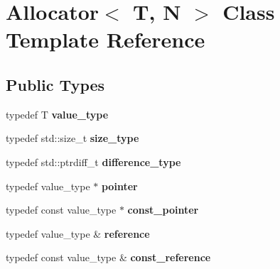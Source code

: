 \hypertarget{classAllocator}{\section{\-Allocator$<$ \-T, \-N $>$ \-Class \-Template \-Reference}
\label{classAllocator}
}
\subsection*{\-Public \-Types}
\begin{DoxyCompactItemize}
\item 
\hypertarget{classAllocator_ad5c51a128db2150e67259f697ef457b9}{typedef \-T {\bfseries value\-\_\-type}}\label{classAllocator_ad5c51a128db2150e67259f697ef457b9}

\item 
\hypertarget{classAllocator_aec4c70d3e80d2b7d11bbb8bd8a62f016}{typedef std\-::size\-\_\-t {\bfseries size\-\_\-type}}\label{classAllocator_aec4c70d3e80d2b7d11bbb8bd8a62f016}

\item 
\hypertarget{classAllocator_a6b650764260187e63d5098f5f38046c2}{typedef std\-::ptrdiff\-\_\-t {\bfseries difference\-\_\-type}}\label{classAllocator_a6b650764260187e63d5098f5f38046c2}

\item 
\hypertarget{classAllocator_a7df4693123ad6d168217e3853cd15495}{typedef value\-\_\-type $\ast$ {\bfseries pointer}}\label{classAllocator_a7df4693123ad6d168217e3853cd15495}

\item 
\hypertarget{classAllocator_a5815a9c01f756005eb19d0ae5aded3be}{typedef const value\-\_\-type $\ast$ {\bfseries const\-\_\-pointer}}\label{classAllocator_a5815a9c01f756005eb19d0ae5aded3be}

\item 
\hypertarget{classAllocator_adf0658602f352de03fa2d2c4f23903e9}{typedef value\-\_\-type \& {\bfseries reference}}\label{classAllocator_adf0658602f352de03fa2d2c4f23903e9}

\item 
\hypertarget{classAllocator_aff863afcf191fb225997ae2d51314bf5}{typedef const value\-\_\-type \& {\bfseries const\-\_\-reference}}\label{classAllocator_aff863afcf191fb225997ae2d51314bf5}

\end{DoxyCompactItemize}
